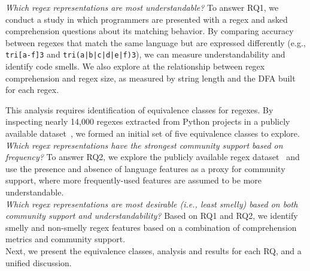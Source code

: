  {\em Which regex representations are most understandable?}
To answer RQ1, we conduct a study in which programmers are presented with a regex and asked comprehension questions about its matching behavior.  By comparing accuracy between regexes that match the same language but are expressed differently (e.g., \verb!tri[a-f]3! and \verb!tri(a|b|c|d|e|f)3!), we can measure understandability and identify code smells. We also explore at the relationship between regex comprehension and regex size, as measured by string length and the DFA built for each regex. 

This analysis requires identification of equivalence classes for regexes. By inspecting  nearly 14,000 regexes extracted from Python projects in a publicly available dataset~\cite{chapman2016}, we formed an initial set of five equivalence classes to explore. \\

 {\em Which regex representations have the strongest {community support} based on  frequency?} %
To answer RQ2, we explore the publicly available regex dataset~\cite{chapman2016} and use the presence and absence of language features as a proxy for community support, where more frequently-used features are assumed to be more understandable.\\

  {\em Which regex representations are most desirable (i.e., least smelly) based on both community support and understandability?}
Based on RQ1 and RQ2, we identify smelly and non-smelly regex features  based on a combination of comprehension metrics and community support. \\

Next, we present the equivalence classes, analysis and results for each RQ, and a unified discussion.



%
%
%
%
%
%
%






